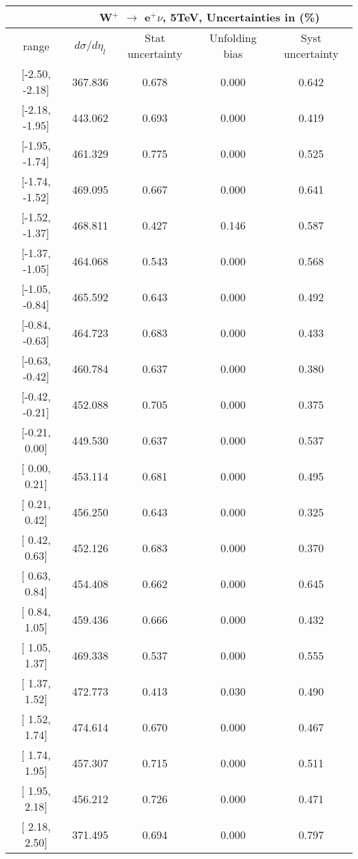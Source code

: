 \documentclass[12pt]{article}
\begin{document}
 
\begin{table}[] 
\begin{tabular}{c|c|c|c|c|}
\cline{2-5}
& \multicolumn{4}{c|}{W$^{+}$ $\rightarrow$ e$^{+} \nu $, 5TeV, Uncertainties in (\%)}  \\ \hline \hline 
\multicolumn{1}{|c|}{  range } & $d\sigma$/$d\eta_{l}$   & Stat uncertainty     & Unfolding bias     & Syst uncertainty        \\ \hline \hline 
\multicolumn{1}{|c|}{{[}-2.50,  -2.18{]}}  & 367.836 & 0.678 & 0.000 & 0.642 \\ \hline 
\multicolumn{1}{|c|}{{[}-2.18,  -1.95{]}}  & 443.062 & 0.693 & 0.000 & 0.419 \\ \hline 
\multicolumn{1}{|c|}{{[}-1.95,  -1.74{]}}  & 461.329 & 0.775 & 0.000 & 0.525 \\ \hline 
\multicolumn{1}{|c|}{{[}-1.74,  -1.52{]}}  & 469.095 & 0.667 & 0.000 & 0.641 \\ \hline 
\multicolumn{1}{|c|}{{[}-1.52,  -1.37{]}}  & 468.811 & 0.427 & 0.146 & 0.587 \\ \hline 
\multicolumn{1}{|c|}{{[}-1.37,  -1.05{]}}  & 464.068 & 0.543 & 0.000 & 0.568 \\ \hline 
\multicolumn{1}{|c|}{{[}-1.05,  -0.84{]}}  & 465.592 & 0.643 & 0.000 & 0.492 \\ \hline 
\multicolumn{1}{|c|}{{[}-0.84,  -0.63{]}}  & 464.723 & 0.683 & 0.000 & 0.433 \\ \hline 
\multicolumn{1}{|c|}{{[}-0.63,  -0.42{]}}  & 460.784 & 0.637 & 0.000 & 0.380 \\ \hline 
\multicolumn{1}{|c|}{{[}-0.42,  -0.21{]}}  & 452.088 & 0.705 & 0.000 & 0.375 \\ \hline 
\multicolumn{1}{|c|}{{[}-0.21,   0.00{]}}  & 449.530 & 0.637 & 0.000 & 0.537 \\ \hline 
\multicolumn{1}{|c|}{{[} 0.00,   0.21{]}}  & 453.114 & 0.681 & 0.000 & 0.495 \\ \hline 
\multicolumn{1}{|c|}{{[} 0.21,   0.42{]}}  & 456.250 & 0.643 & 0.000 & 0.325 \\ \hline 
\multicolumn{1}{|c|}{{[} 0.42,   0.63{]}}  & 452.126 & 0.683 & 0.000 & 0.370 \\ \hline 
\multicolumn{1}{|c|}{{[} 0.63,   0.84{]}}  & 454.408 & 0.662 & 0.000 & 0.645 \\ \hline 
\multicolumn{1}{|c|}{{[} 0.84,   1.05{]}}  & 459.436 & 0.666 & 0.000 & 0.432 \\ \hline 
\multicolumn{1}{|c|}{{[} 1.05,   1.37{]}}  & 469.338 & 0.537 & 0.000 & 0.555 \\ \hline 
\multicolumn{1}{|c|}{{[} 1.37,   1.52{]}}  & 472.773 & 0.413 & 0.030 & 0.490 \\ \hline 
\multicolumn{1}{|c|}{{[} 1.52,   1.74{]}}  & 474.614 & 0.670 & 0.000 & 0.467 \\ \hline 
\multicolumn{1}{|c|}{{[} 1.74,   1.95{]}}  & 457.307 & 0.715 & 0.000 & 0.511 \\ \hline 
\multicolumn{1}{|c|}{{[} 1.95,   2.18{]}}  & 456.212 & 0.726 & 0.000 & 0.471 \\ \hline 
\multicolumn{1}{|c|}{{[} 2.18,   2.50{]}}  & 371.495 & 0.694 & 0.000 & 0.797 \\ \hline 
\end{tabular}
\end{table}
\end{document}
